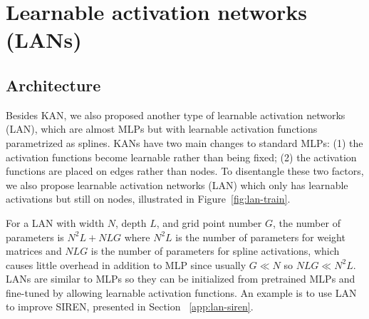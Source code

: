 \documentclass{article}
\numberwithin{equation}{section}
\numberwithin{figure}{section}
\begin{document}

\section{Learnable activation networks (LANs)}\label{app:lan}

\subsection{Architecture}

Besides KAN, we also proposed another type of learnable activation networks (LAN), which are almost MLPs but with learnable activation functions parametrized as splines. KANs have two main changes to standard MLPs: (1) the activation functions become learnable rather than being fixed; (2) the activation functions are placed on edges rather than nodes. To disentangle these two factors, we also propose learnable activation networks (LAN) which only has learnable activations but still on nodes, illustrated in Figure~\ref{fig:lan-train}.

For a LAN with width $N$, depth $L$, and grid point number $G$, the number of parameters is $N^2L+NLG$ where $N^2L$ is the number of parameters for weight matrices and $NLG$ is the number of parameters for spline activations, which causes little overhead in addition to MLP since usually $G\ll N$ so $NLG\ll N^2 L$. LANs are similar to MLPs so they can be initialized from pretrained MLPs and fine-tuned by allowing learnable activation functions. An example is to use LAN to improve SIREN, presented in Section ~\ref{app:lan-siren}. 
\end{document}
